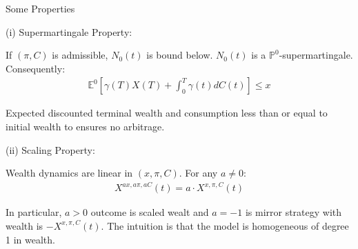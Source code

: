 \documentclass{beamer}
\begin{document}
\begin{frame}{Some Properties}

    {\footnotesize \footnotesize
    \par (i) Supermartingale Property:
    \vspace{1em}
    \par If $(\pi,C)$ is admissible, $N_0(t)$ is bound below.  $N_0(t)$ is a $\mathbb{P}^0$-supermartingale. Consequently:
    \begin{align*}
          \mathbb{E}^0 \left[ \gamma(T)X(T) + \int_0^T \gamma(t)dC(t) \right] \leq x
    \end{align*}
    \par  Expected discounted terminal wealth and consumption less than or equal to initial wealth to ensures no arbitrage.
    \vspace{1em}
    \par  \pause (ii) Scaling Property:
    \vspace{1em}
    \par Wealth dynamics are linear in $(x, \pi, C)$. For any $a \neq 0$:
    \begin{align*}
         X^{ax, a\pi, aC}(t) = a \cdot X^{x, \pi, C}(t)
    \end{align*}
    \par In particular,  $a > 0$ outcome is scaled wealt and $a = -1$ is mirror strategy with wealth is $-X^{x, \pi, C}(t)$. 
    The intuition is that the model is homogeneous of degree 1 in wealth.
    }
\end{frame} 
\end{document}
